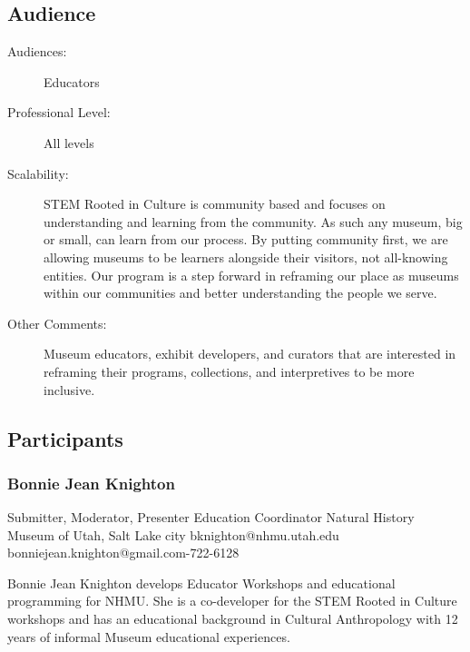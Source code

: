 \documentclass{report}
\begin{document}
              \subsection*{Audience}
                \begin{description}
                  \item [Audiences:]Educators~
                  \item[Professional Level:]All levels~
                \item[Scalability:] STEM Rooted in Culture is community based and focuses on understanding and learning from the community. As such any museum, big or small, can learn from our process. By putting community first, we are allowing museums to be learners alongside their visitors, not all-knowing entities. Our program is a step forward in reframing our place as museums within our communities and better understanding the people we serve. 

							
              \item[Other Comments:] Museum educators, exhibit developers, and curators that are interested in reframing their programs, collections, and interpretives to be more inclusive.
              \end{description}
            \subsection*{Participants}
              \subsubsection*{ Bonnie Jean Knighton }
              Submitter, Moderator, Presenter\newline
              Education Coordinator\newline
              Natural History Museum of Utah, Salt Lake city
              \newline
              bknighton@nhmu.utah.edu\newline
              bonniejean.knighton@gmail.com-722-6128\newline

              Bonnie Jean Knighton develops Educator Workshops and educational programming
for NHMU. She is a co-developer for the STEM Rooted in Culture workshops and has an educational background in Cultural Anthropology with 12 years of informal Museum educational experiences.\newline
\end{document}

